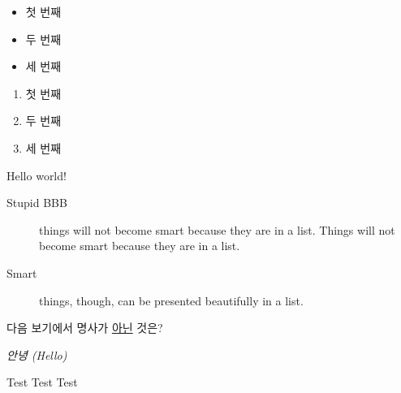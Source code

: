 \documentclass[chapter, footnote, a4paper, 10pt]{oblivoir}
\begin{document}
\begin{itemize}
\item 첫 번째
\item 두 번째
\item 세 번째
\end{itemize}

\begin{enumerate}
\item 첫 번째
\item 두 번째
\item 세 번째
\end{enumerate}

\noindent
Hello world!

\begin{description}
\item[Stupid BBB] things will not become smart because they are in a list. Things will not become smart because they are in a list.
\item[Smart] things, though, can be presented beautifully in a list.
\end{description}


다음 보기에서 명사가 \uline{아닌} 것은?

\textit{안녕 (Hello)}

\begin{mdframed}[frametitle=Test]
Test Test Test
\end{mdframed}

\tableofcontents*






\printindex
\end{document}
